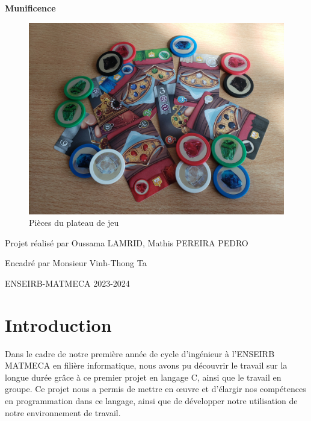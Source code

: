\documentclass{article}
\begin{document}
\begin{titlepage}
    \centering
    \Huge\bfseries
    Munificence

    \vspace{3cm}
    
\begin{figure}[ht]
    \centering
    \includegraphics[width=0.70\linewidth]{projMunificence.jpg}
    \caption{\large Pièces du plateau de jeu}
    \label{fig:projMunificence}
\end{figure}
    
    
    \vspace{3cm}
    
    \Large
    Projet réalisé par 
    Oussama LAMRID, Mathis PEREIRA PEDRO 
    
    \vspace{1cm} 
    
    \Large 
    Encadré par Monsieur Vinh-Thong Ta
    
    \vspace{1cm}

    
    \Large
    ENSEIRB-MATMECA 2023-2024
    
    \vspace{0.5cm} 

    
    \vfill %
    
   
\end{titlepage}



\renewcommand{\contentsname}{Sommaire}

\tableofcontents

%
\newpage
\section{Introduction}
\hspace{1em}Dans le cadre de notre première année de cycle d'ingénieur à l'ENSEIRB MATMECA en filière informatique, nous avons pu découvrir le travail sur la longue durée grâce à ce premier projet en langage C, ainsi que le travail en groupe. Ce projet nous a permis de mettre en œuvre et d'élargir nos compétences en programmation dans ce langage, ainsi que de développer notre utilisation de notre environnement de travail.
\end{document}
